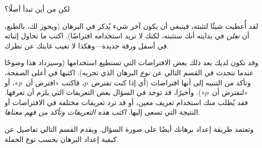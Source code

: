 \documentclass[../../../include/open-logic-section]{subfiles}
\begin{document}


لكن من أين تبدأ أصلًا؟

لقد أُعطيت شيئًا لتثبته، فينبغي أن يكون آخر شيء يُذكر في البرهان
(ويجوز لك، بالطبع، أن \emph{تعلن} في بدايته أنك ستثبته، لكنك لا تريد
استخدامه افتراضًا). اكتب ما تحاول إثباته في أسفل ورقة جديدة---وهكذا
لا تغيب غايتك عن نظرك.

وقد تكون لديك بعد ذلك بعض الافتراضات التي تستطيع استخدامها (وسيزداد
هذا وضوحًا عندما نتحدث في القسم التالي عن \emph{نوع} البرهان الذي
تجريه). اكتبها في أعلى الصفحة، وتأكد من التنبيه إلى أنها افتراضات
(أي إذا كنت تفترض~$p$، فاكتب «افترض أن~$p$»، أو «لنفترض أن~$p$»).
وأخيرًا، قد توجد في السؤال بعض التعريفات التي يلزم أن تعرفها. فقد
يُطلب منك استخدام تعريف معين، أو قد ترد تعريفات مختلفة في الافتراضات
أو النتيجة التي تسعى إليها. \emph{اكتب هذه التعريفات وتأكد من فهم
معناها.}

وتعتمد طريقة إعداد برهانك أيضًا على صورة السؤال. ويقدم القسم التالي
تفاصيل عن كيفية إعداد البرهان بحسب نوع الجملة.
\end{document}
